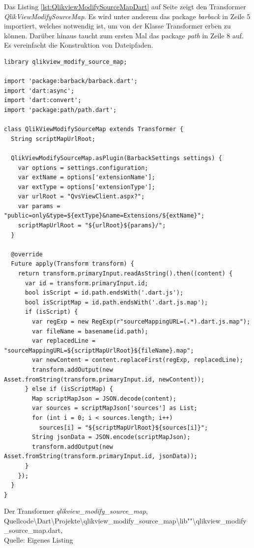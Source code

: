 Das Listing \ref{lst:QlikviewModifySourceMapDart} auf Seite \pageref{lst:QlikviewModifySourceMapDart} zeigt den Transformer \textit{QlikViewModifySourceMap}. Es wird unter anderem das package \textit{barback} in Zeile 5 importiert, welches notwendig ist, um von der Klasse Transformer erben zu können. Darüber hinaus taucht zum ersten Mal das package \textit{path} in Zeile 8 auf. Es vereinfacht die Konstruktion von Dateipfaden.

\ifIncludeFigures\begin{listing}[htbp]
\begin{verbatim}
library qlikview_modify_source_map;

import 'package:barback/barback.dart';
import 'dart:async';
import 'dart:convert';
import 'package:path/path.dart';

class QlikViewModifySourceMap extends Transformer {
  String scriptMapUrlRoot;

  QlikViewModifySourceMap.asPlugin(BarbackSettings settings) {
    var options = settings.configuration;
    var extName = options['extensionName'];
    var extType = options['extensionType'];
    var urlRoot = "QvsViewClient.aspx?";
    var params = "public=only&type=${extType}&name=Extensions/${extName}";
    scriptMapUrlRoot = "${urlRoot}${params}/";
  }

  @override
  Future apply(Transform transform) {
    return transform.primaryInput.readAsString().then((content) {
      var id = transform.primaryInput.id;      
      bool isScript = id.path.endsWith('.dart.js');
      bool isScriptMap = id.path.endsWith('.dart.js.map');
      if (isScript) {
        var regExp = new RegExp(r"sourceMappingURL=(.*).dart.js.map");
        var fileName = basename(id.path);
        var replacedLine = "sourceMappingURL=${scriptMapUrlRoot}${fileName}.map";
        var newContent = content.replaceFirst(regExp, replacedLine);
        transform.addOutput(new Asset.fromString(transform.primaryInput.id, newContent));
      } else if (isScriptMap) {
        Map scriptMapJson = JSON.decode(content);
        var sources = scriptMapJson['sources'] as List;
        for (int i = 0; i < sources.length; i++) 
          sources[i] = "${scriptMapUrlRoot}${sources[i]}";
        String jsonData = JSON.encode(scriptMapJson);
        transform.addOutput(new Asset.fromString(transform.primaryInput.id, jsonData));
      }
    });
  }
}
\end{verbatim}
\caption[Der Transformer \textit{qlikview\_modify\_source\_map}]{Der Transformer \textit{qlikview\_modify\_source\_map}, \\Quellcode\textbackslash{}Dart\textbackslash{}Projekte\textbackslash{}qlikview\_modify\_source\_map\textbackslash{}lib""\textbackslash{}qlikview\_modify\_source\_map.dart, \\Quelle: Eigenes Listing}
\label{lst:QlikviewModifySourceMapDart}
\end{listing}\fi




